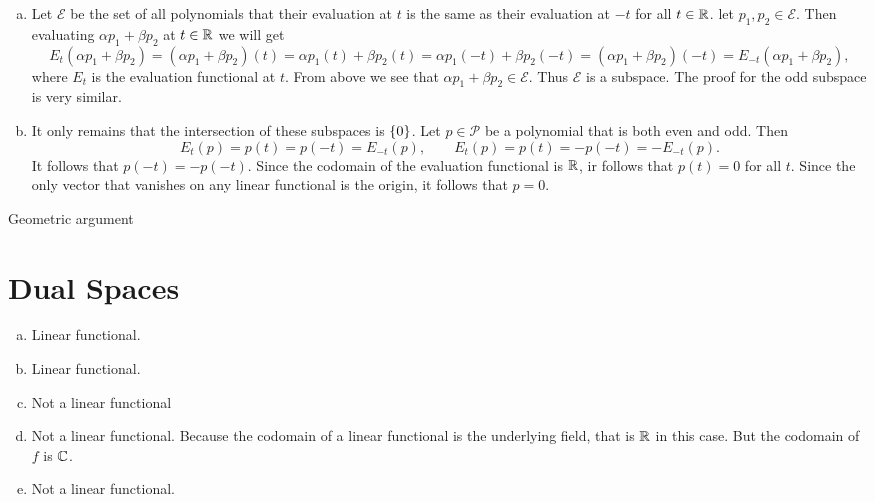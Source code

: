 \begin{problem}
	\begin{solution}
		\begin{enumerate}[(a)]
			\item Let $ \mathcal{E} $ be the set of all polynomials that their evaluation at $ t $ is the same as their evaluation at $ -t $ for all $ t\in \mathbb{R} $. let $ p_1,p_2 \in \mathcal{E} $. Then evaluating $ \alpha p_1 + \beta p_2 $ at $ t\in \mathbb{R} $ we will get
			\[ E_t(\alpha p_1+ \beta p_2) = (\alpha p_1 + \beta p_2)(t) = \alpha p_1(t) + \beta p_2(t) = \alpha p_1(-t) + \beta p_2(-t) = (\alpha p_1+ \beta p_2)(-t) = E_{-t}(\alpha p_1+\beta p_2), \]
			where $ E_t $ is the evaluation functional at $ t $. From above we see that $ \alpha p_1 + \beta p_2 \in \mathcal{E} $. Thus $ \mathcal{E} $ is a subspace. The proof for the odd subspace is very similar.
			
			\item It only remains that the intersection of these subspaces is $ \{0\} $. Let $ p \in \mathcal{P} $ be a polynomial that is both even and odd. Then 
			\[ E_t (p) = p(t) = p(-t) = E_{-t}(p), \qquad  E_{t}(p) = p(t) = -p(-t) = -E_{-t}(p). \]
			It follows that $ p(-t) = -p(-t) $. Since the codomain of the evaluation functional is $ \mathbb{R} $, ir follows that $ p(t) = 0 $ for all $ t $. Since the only vector that vanishes on any linear functional is the origin, it follows that $ p = 0 $. 
		\end{enumerate}
	\end{solution}
	\begin{remark} 
		Geometric argument
	\end{remark}
\end{problem}


\section{Dual Spaces}
\begin{problem}
	\begin{solution}
		\begin{enumerate}[(a)]
			\item Linear functional.
			\item Linear functional.
			\item Not a linear functional
			\item Not a linear functional. Because the codomain of a linear functional is the underlying field, that is $ \mathbb{R} $ in this case. But the codomain of $ f $ is $ \mathbb{C} $.
			\item Not a linear functional.
		\end{enumerate}
	\end{solution}
\end{problem}

